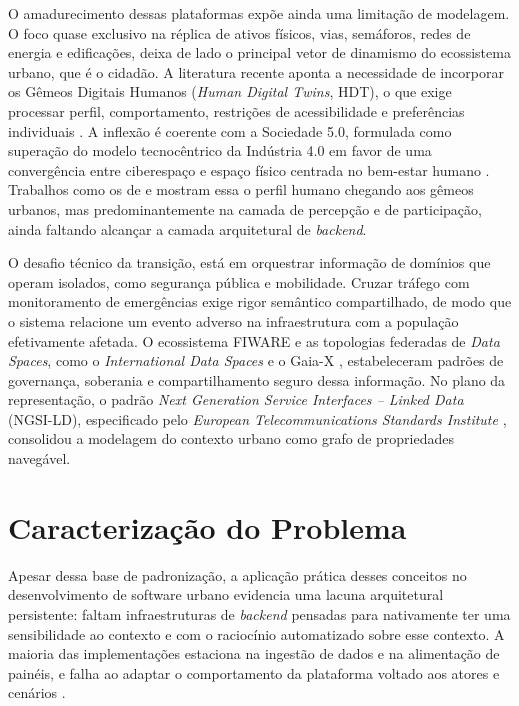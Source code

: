 O amadurecimento dessas plataformas expõe ainda uma limitação de modelagem. O foco quase exclusivo na réplica de ativos físicos, vias, semáforos, redes de energia e edificações, deixa de lado o principal vetor de dinamismo do ecossistema urbano, que é o cidadão. A literatura recente aponta a necessidade de incorporar os Gêmeos Digitais Humanos (\textit{Human Digital Twins}, HDT), o que exige processar perfil, comportamento, restrições de acessibilidade e preferências individuais \cite{asad2023human,fontes2024human}. A inflexão é coerente com a Sociedade 5.0, formulada como superação do modelo tecnocêntrico da Indústria 4.0 em favor de uma convergência entre ciberespaço e espaço físico centrada no bem-estar humano \cite{deguchi2020from}. Trabalhos como os de  e  mostram essa o perfil humano chegando aos gêmeos urbanos, mas predominantemente na camada de percepção e de participação, ainda faltando alcançar a camada arquitetural de \textit{backend}.

O desafio técnico da transição, está em orquestrar informação de domínios que operam isolados, como segurança pública e mobilidade. Cruzar tráfego com monitoramento de emergências exige rigor semântico compartilhado, de modo que o sistema relacione um evento adverso na infraestrutura com a população efetivamente afetada. O ecossistema FIWARE \cite{cirillo2019standard,bauer2022fiware} e as topologias federadas de \textit{Data Spaces}, como o \textit{International Data Spaces} e o Gaia-X \cite{otto2019international,tardieu2022role}, estabeleceram padrões de governança, soberania e compartilhamento seguro dessa informação. No plano da representação, o padrão \textit{Next Generation Service Interfaces -- Linked Data} (NGSI-LD), especificado pelo \textit{European Telecommunications Standards Institute} \cite{etsi2024ngsild}, consolidou a modelagem do contexto urbano como grafo de propriedades navegável.

\section{Caracterização do Problema}
\label{sec:problema}

Apesar dessa base de padronização, a aplicação prática desses conceitos no desenvolvimento de software urbano evidencia uma lacuna arquitetural persistente: faltam infraestruturas de \textit{backend} pensadas para nativamente ter uma sensibilidade ao contexto e com o raciocínio automatizado sobre esse contexto. A maioria das implementações estaciona na ingestão de dados e na alimentação de painéis, e falha ao adaptar o comportamento da plataforma voltado aos atores e cenários \cite{ketzler2020digital,ferrebigorra2022adoption,haraguchi2024assessing}.


